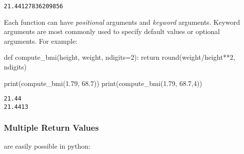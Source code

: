 \documentclass[
  letterpaper,
  DIV=11,
  numbers=noendperiod]{scrreprt}
\newenvironment{Shaded}{\begin{snugshade}}{\end{snugshade}}
\newcommand{\BuiltInTok}[1]{\textcolor[rgb]{0.00,0.23,0.31}{#1}}
\newcommand{\ControlFlowTok}[1]{\textcolor[rgb]{0.00,0.23,0.31}{#1}}
\newcommand{\DecValTok}[1]{\textcolor[rgb]{0.68,0.00,0.00}{#1}}
\newcommand{\FloatTok}[1]{\textcolor[rgb]{0.68,0.00,0.00}{#1}}
\newcommand{\KeywordTok}[1]{\textcolor[rgb]{0.00,0.23,0.31}{#1}}
\newcommand{\NormalTok}[1]{\textcolor[rgb]{0.00,0.23,0.31}{#1}}
\newcommand{\OperatorTok}[1]{\textcolor[rgb]{0.37,0.37,0.37}{#1}}
\begin{document}
\begin{verbatim}
21.44127836209856
\end{verbatim}

Each function can have \emph{positional} arguments and \emph{keyword}
arguments. Keyword arguments are most commonly used to specify default
values or optional arguments. For example:

\begin{Shaded}
\begin{Highlighting}[]
\KeywordTok{def}\NormalTok{ compute\_bmi(height, weight, ndigits}\OperatorTok{=}\DecValTok{2}\NormalTok{):}
    \ControlFlowTok{return} \BuiltInTok{round}\NormalTok{(weight}\OperatorTok{/}\NormalTok{height}\OperatorTok{**}\DecValTok{2}\NormalTok{, ndigits)}

\BuiltInTok{print}\NormalTok{(compute\_bmi(}\FloatTok{1.79}\NormalTok{, }\FloatTok{68.7}\NormalTok{))}
\BuiltInTok{print}\NormalTok{(compute\_bmi(}\FloatTok{1.79}\NormalTok{, }\FloatTok{68.7}\NormalTok{,}\DecValTok{4}\NormalTok{))}
\end{Highlighting}
\end{Shaded}

\begin{verbatim}
21.44
21.4413
\end{verbatim}

\hypertarget{multiple-return-values}{%
\subsubsection{Multiple Return Values}\label{multiple-return-values}}

are easily possible in python:
\end{document}
